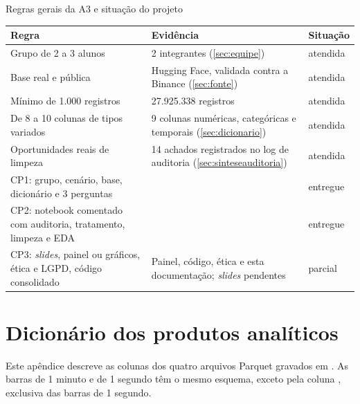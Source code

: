 \begin{quadro}[htbp]
\caption{\label{qua:regras}Regras gerais da A3 e situação do projeto}
\begin{corpotabela}
\begin{tabularx}{\textwidth}{|L{4.6cm}|Y|C{2.0cm}|}
\hline
\textbf{Regra} & \textbf{Evidência} & \textbf{Situação} \\ \hline
Grupo de 2 a 3 alunos & 2 integrantes (\autoref{sec:equipe}) & atendida \\ \hline
Base real e pública & Hugging Face, validada contra a Binance (\autoref{sec:fonte}) & atendida \\ \hline
Mínimo de 1.000 registros & 27.925.338 registros & atendida \\ \hline
De 8 a 10 colunas de tipos variados & 9 colunas numéricas, categóricas e temporais (\autoref{sec:dicionario}) & atendida \\ \hline
Oportunidades reais de limpeza & 14 achados registrados no log de auditoria (\autoref{sec:sinteseauditoria}) & atendida \\ \hline
CP1: grupo, cenário, base, dicionário e 3 perguntas &  & entregue \\ \hline
CP2: notebook comentado com auditoria, tratamento, limpeza e EDA &  & entregue \\ \hline
CP3: \textit{slides}, painel ou gráficos, ética e LGPD, código consolidado & Painel, código, ética e esta documentação; \textit{slides} pendentes & parcial \\ \hline
\end{tabularx}
\end{corpotabela}
\fonteautores[Elaborado]
\end{quadro}

\chapter{Dicionário dos produtos analíticos}\label{apendice:dicionario}

Este apêndice descreve as colunas dos quatro arquivos Parquet gravados em
. As barras de 1 minuto e de 1 segundo têm o mesmo
esquema, exceto pela coluna , exclusiva das barras de 1 segundo.

